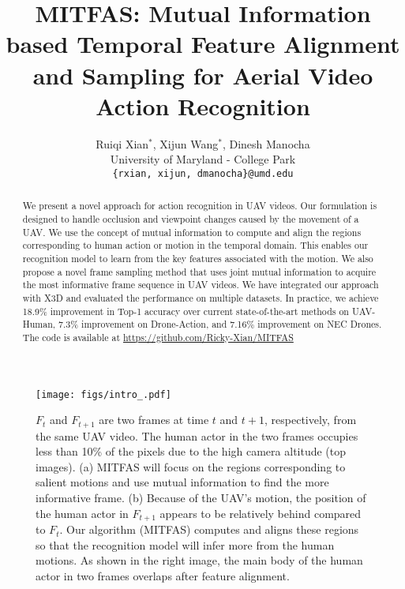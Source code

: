 \documentclass[10pt,twocolumn,letterpaper]{article}
\begin{document}
\title{MITFAS: Mutual Information based Temporal Feature Alignment and Sampling for Aerial Video Action Recognition}

\author{Ruiqi Xian$^*$, Xijun Wang$^*$, Dinesh Manocha\\
University of Maryland - College Park\\
{\tt\small \{rxian, xijun, dmanocha\}@umd.edu}
}
\maketitle
\def\thefootnote{*}\def\thefootnote{\arabic{footnote}}
\begin{abstract}
We present a novel approach for action recognition in UAV videos. 
Our formulation is designed to handle occlusion and viewpoint changes caused by the movement of a UAV. We use the concept of mutual information to compute and align the regions corresponding to human action or motion in the temporal domain. This enables our recognition model to learn from the key features associated with the motion. We also propose a novel frame sampling method that uses  joint mutual information to acquire the most informative frame sequence 
in UAV videos. We have integrated our approach with X3D and evaluated the performance on multiple datasets. In practice, we achieve 18.9\% improvement in Top-1 accuracy over current state-of-the-art methods on UAV-Human\cite{li2021uav}, 7.3\% improvement on Drone-Action\cite{perera2019drone}, and 7.16\% improvement on NEC Drones\cite{choi2020unsupervised}. The code is available at \href{https://github.com/Ricky-Xian/MITFAS}{https://github.com/Ricky-Xian/MITFAS}
\end{abstract} \begin{figure}[t]
    \centering
    \texttt{[image: figs/intro\_.pdf]}
    \vspace{-6mm}
    \caption{$F_t$ and $F_{t+1}$ are two frames at time $t$ and $t+1$, respectively, from the same UAV video. The human actor in the two frames occupies less than 10\% of the pixels due to the high camera altitude (top images). (a) MITFAS will focus on the regions corresponding to salient motions and use mutual information to find the more informative frame. (b) Because of the UAV's motion, the position of the human actor in $F_{t+1}$ appears to be relatively behind compared to $F_t$. Our algorithm (MITFAS) computes and aligns these regions so that the recognition model will infer more from the human motions. As shown in the right image, the main body of the human actor in two frames overlaps after feature alignment.  
    }
    \label{fig:intro}
    \vspace{-2mm}
\end{figure}
\end{document}
